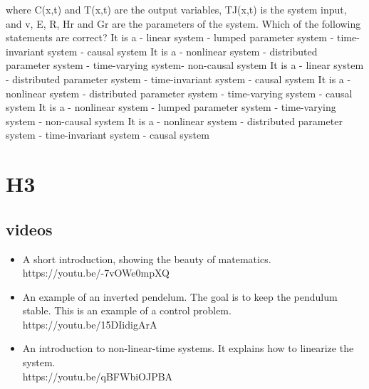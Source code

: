 \documentclass{document}
\begin{document}
\begin{itemize}
			where C(x,t) and T(x,t) are the output variables, TJ(x,t) is the system input, and v, E, R, Hr and Gr are the parameters of the system. Which of the following statements are correct?
			It is a
			- linear system
			- lumped parameter system
			- time-invariant system
			​- causal system
			It is a
			- nonlinear system
			- distributed parameter system
			- time-varying system
			​- non-causal system
			It is a
			- linear system
			- distributed parameter system
			- time-invariant system
			​- causal system
			It is a
			- nonlinear system
			- distributed parameter system
			- time-varying system
			​- causal system
			It is a
			- nonlinear system
			- lumped parameter system
			- time-varying system
			​- non-causal system
			It is a
			- nonlinear system
			- distributed parameter system
			- time-invariant system
			​- causal system
		\end{itemize}
			
		\section{H3}
			\subsection{videos}
			\begin{itemize}
			\item A short introduction, showing the beauty of matematics.
			https://youtu.be/-7vOWe0mpXQ
			\item An example of an inverted pendelum. The goal is to keep the pendulum stable. This is an example of a control problem. \\
			https://youtu.be/15DIidigArA
			\item An introduction to non-linear-time systems. It explains how to linearize the system.\\ https://youtu.be/qBFWbiOJPBA
		\end{itemize}
\end{document}
